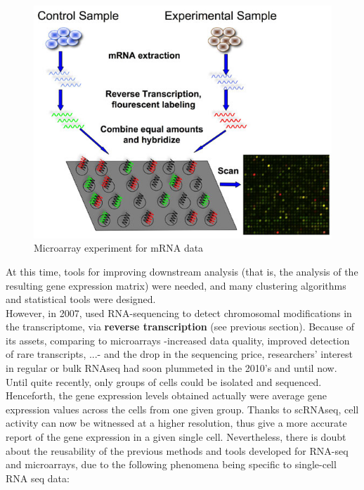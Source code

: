 \documentclass{report}
\begin{document}
\begin{figure}[H]
\centering
\includegraphics[scale=0.5]{illustrations/microarray.jpg}
\caption{Microarray experiment for mRNA data}
\label{microarray}
\end{figure}

At this time, tools for improving downstream analysis (that is, the analysis of the resulting gene expression matrix) were needed, and many clustering algorithms\cite{do2008clustering}\cite{dabney2005classification}\cite{eisen1998cluster}\cite{monti2003consensus} and statistical tools\cite{simon2007analysis}\cite{kerr2000analysis} were designed.\\

However, in 2007, \cite{barbazuk2007snp} used RNA-sequencing to detect chromosomal modifications in the transcriptome, via \textbf{reverse transcription} (see previous section). Because of its assets, comparing to microarrays -increased data quality\cite{zhao2014comparison}\cite{wang2009rna}, improved detection of rare transcripts, ...\cite{illuminarnamicroarray}- and the drop in the sequencing price, researchers' interest in regular or bulk RNAseq had soon plummeted in the 2010's and until now\cite{conesa2016survey}\cite{leon2015bayesian}.\\

Until quite recently, only groups of cells could be isolated and sequenced. Henceforth, the gene expression levels obtained actually were average gene expression values across the cells from one given group. Thanks to scRNAseq, cell activity can now be witnessed at a higher resolution, thus give a more accurate report of the gene expression in a given single cell\cite{stegle2015computational}\cite{poirion2016single}. Nevertheless, there is doubt about the reusability of the previous methods and tools developed for RNA-seq and microarrays, due to the following phenomena being specific to single-cell RNA seq data:\\
\end{document}
